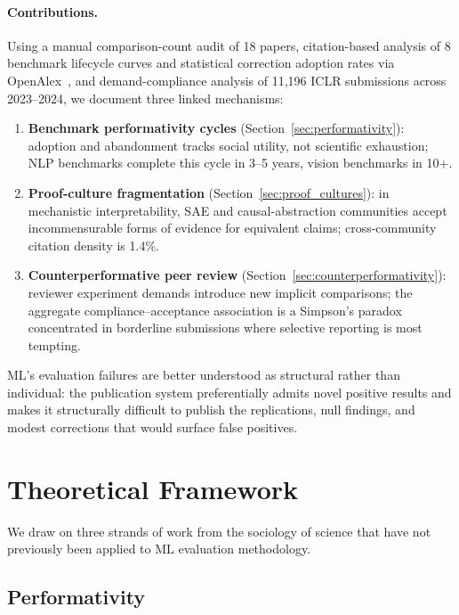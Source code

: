 \documentclass{article}
\begin{document}
\paragraph{Contributions.} Using a manual comparison-count audit of 18 papers, citation-based analysis of 8 benchmark lifecycle curves and statistical correction adoption rates via OpenAlex~\citep{priem_openalex_2022}, and demand-compliance analysis of 11,196 ICLR submissions across 2023--2024, we document three linked mechanisms:

\begin{enumerate}[leftmargin=*]
\item \textbf{Benchmark performativity cycles} (Section~\ref{sec:performativity}): adoption and abandonment tracks social utility, not scientific exhaustion; NLP benchmarks complete this cycle in 3--5 years, vision benchmarks in 10+.
\item \textbf{Proof-culture fragmentation} (Section~\ref{sec:proof_cultures}): in mechanistic interpretability, SAE and causal-abstraction communities accept incommensurable forms of evidence for equivalent claims; cross-community citation density is 1.4\%.
\item \textbf{Counterperformative peer review} (Section~\ref{sec:counterperformativity}): reviewer experiment demands introduce new implicit comparisons; the aggregate compliance--acceptance association is a Simpson's paradox concentrated in borderline submissions where selective reporting is most tempting.
\end{enumerate}

ML's evaluation failures are better understood as structural rather than individual: the publication system preferentially admits novel positive results and makes it structurally difficult to publish the replications, null findings, and modest corrections that would surface false positives.

\section{Theoretical Framework}
\label{sec:theory}

We draw on three strands of work from the sociology of science that have not previously been applied to ML evaluation methodology.

\subsection{Performativity}
\end{document}

